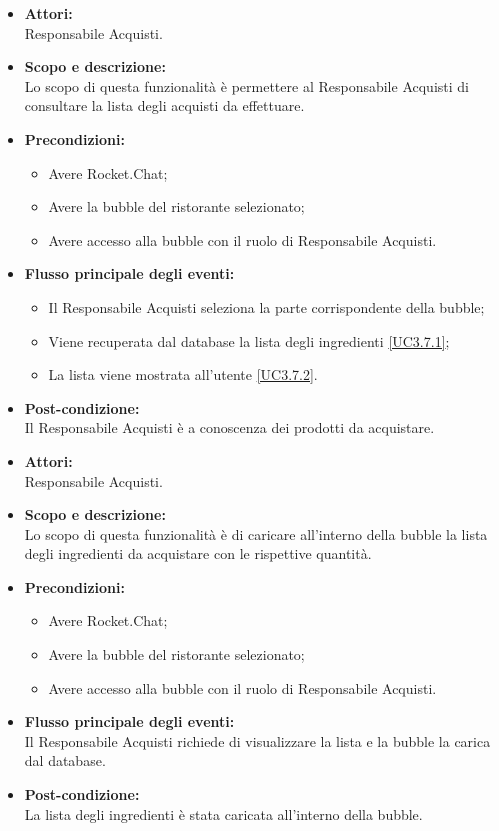 \begin{itemize}
	\item \textbf{Attori:}
	\\Responsabile Acquisti.
	\item \textbf{Scopo e descrizione:} 
	\\Lo scopo di questa funzionalità è permettere al Responsabile Acquisti di consultare la lista degli acquisti da effettuare.
	\item \textbf{Precondizioni:}
	\begin{itemize}
		\item Avere Rocket.Chat;
		\item Avere la bubble del ristorante selezionato;
		\item Avere accesso alla bubble con il ruolo di Responsabile Acquisti.
	\end{itemize}
	\item \textbf{Flusso principale degli eventi:}
	\begin{itemize}
		\item Il Responsabile Acquisti seleziona la parte corrispondente della bubble;
		\item Viene recuperata dal database la lista degli ingredienti \ref{UC3.7.1};
		\item La lista viene mostrata all'utente \ref{UC3.7.2}.
	\end{itemize}
	\item \textbf{Post-condizione:}
	\\Il Responsabile Acquisti è a conoscenza dei prodotti da acquistare.
\end{itemize}


\begin{itemize}
	\item \textbf{Attori:}
	\\Responsabile Acquisti.
	\item \textbf{Scopo e descrizione:} 
	\\Lo scopo di questa funzionalità è di caricare all'interno della bubble la lista degli ingredienti da acquistare con le rispettive quantità.
	\item \textbf{Precondizioni:}
	\begin{itemize}
		\item Avere Rocket.Chat;
		\item Avere la bubble del ristorante selezionato;
		\item Avere accesso alla bubble con il ruolo di Responsabile Acquisti.
	\end{itemize}
	\item \textbf{Flusso principale degli eventi:}
	\\Il Responsabile Acquisti richiede di visualizzare la lista e la bubble la carica dal database.
	\item \textbf{Post-condizione:}
	\\La lista degli ingredienti è stata caricata all'interno della bubble.
\end{itemize}

